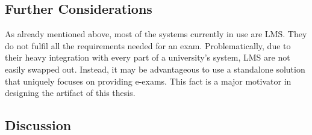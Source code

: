 \hypertarget{further-considerations}{%
\subsection{Further Considerations}\label{further-considerations}}

As already mentioned above, most of the systems currently in use are
LMS. They do not fulfil all the requirements needed for an exam.
Problematically, due to their heavy integration with every part of a
university's system, LMS are not easily swapped out. Instead, it may be
advantageous to use a standalone solution that uniquely focuses on
providing e-exams. This fact is a major motivator in designing the
artifact of this thesis.

\hypertarget{discussion}{%
\subsection{Discussion}\label{discussion}}

